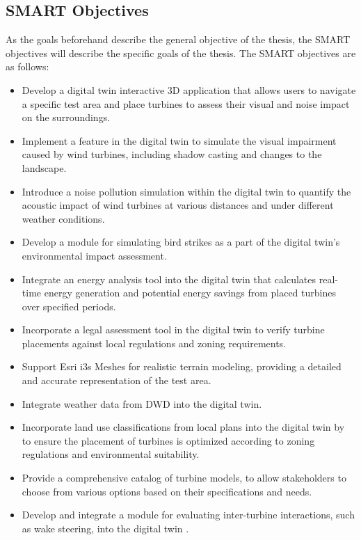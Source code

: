 \documentclass[11pt, titlepage, a4paper]{article}
\begin{document}
\begin{linenumbers}
    \subsection{SMART Objectives}
    As the goals beforehand describe the general objective of the thesis, the SMART objectives will describe the specific goals of the thesis. The SMART objectives are as follows:
    \begin{itemize}[label={--}]
        \item Develop a digital twin interactive 3D application  that allows users to navigate a specific test area and place turbines to assess their visual and noise impact on the surroundings.
        \item Implement a feature  in the digital twin to simulate the visual impairment caused by wind turbines, including shadow casting and changes to the landscape.
        \item Introduce a noise pollution simulation within the digital twin to quantify the acoustic impact of wind turbines at various distances and under different weather conditions.
        \item Develop a module for simulating bird strikes as a part of the digital twin’s environmental impact assessment.
        \item Integrate an energy analysis tool into the digital twin  that calculates real-time energy generation and potential energy savings from placed turbines over specified periods.
        \item Incorporate a legal assessment tool  in the digital twin to verify turbine placements against local regulations and zoning requirements.
        \item Support Esri i3s Meshes for realistic terrain modeling, providing a detailed and accurate representation of the test area.
        \item Integrate weather data from DWD into the digital twin.
        \item Incorporate land use classifications from local plans into the digital twin by to ensure the placement of turbines is optimized according to zoning regulations and environmental suitability.
        \item Provide a comprehensive catalog of turbine models, to allow stakeholders to choose from various options based on their specifications and needs.
        \item Develop and integrate a module for evaluating inter-turbine interactions, such as wake steering, into the digital twin \cite{howlandWindFarmPower2019a}.

\end{itemize}
\end{linenumbers}
\end{document}
